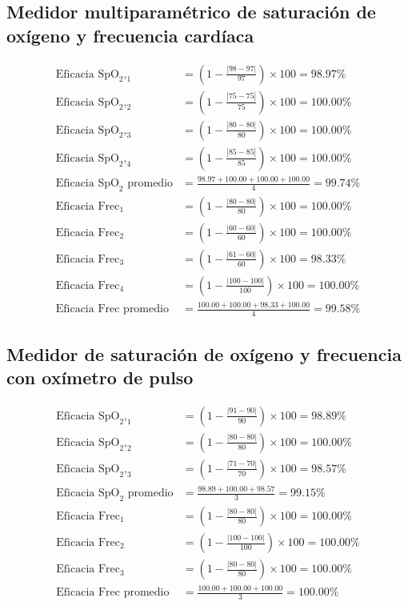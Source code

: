 \subsection{Medidor multiparamétrico de saturación de oxígeno y frecuencia cardíaca}
\begin{align*}
\text{Eficacia SpO}_2\text{,}_1 &= \left(1 - \frac{|98-97|}{97}\right) \times 100 = 98.97\% \\
\text{Eficacia SpO}_2\text{,}_2 &= \left(1 - \frac{|75-75|}{75}\right) \times 100 = 100.00\% \\
\text{Eficacia SpO}_2\text{,}_3 &= \left(1 - \frac{|80-80|}{80}\right) \times 100 = 100.00\% \\
\text{Eficacia SpO}_2\text{,}_4 &= \left(1 - \frac{|85-85|}{85}\right) \times 100 = 100.00\% \\
\text{Eficacia SpO}_2\text{ promedio} &= \frac{98.97 + 100.00 + 100.00 + 100.00}{4} = 99.74\% \\[10pt]
\text{Eficacia Frec}_1 &= \left(1 - \frac{|80-80|}{80}\right) \times 100 = 100.00\% \\
\text{Eficacia Frec}_2 &= \left(1 - \frac{|60-60|}{60}\right) \times 100 = 100.00\% \\
\text{Eficacia Frec}_3 &= \left(1 - \frac{|61-60|}{60}\right) \times 100 = 98.33\% \\
\text{Eficacia Frec}_4 &= \left(1 - \frac{|100-100|}{100}\right) \times 100 = 100.00\% \\
\text{Eficacia Frec promedio} &= \frac{100.00 + 100.00 + 98.33 + 100.00}{4} = 99.58\%
\end{align*}

\subsection{Medidor de saturación de oxígeno y frecuencia con oxímetro de pulso}
\begin{align*}
\text{Eficacia SpO}_2\text{,}_1 &= \left(1 - \frac{|91-90|}{90}\right) \times 100 = 98.89\% \\
\text{Eficacia SpO}_2\text{,}_2 &= \left(1 - \frac{|80-80|}{80}\right) \times 100 = 100.00\% \\
\text{Eficacia SpO}_2\text{,}_3 &= \left(1 - \frac{|71-70|}{70}\right) \times 100 = 98.57\% \\
\text{Eficacia SpO}_2\text{ promedio} &= \frac{98.89 + 100.00 + 98.57}{3} = 99.15\% \\[10pt]
\text{Eficacia Frec}_1 &= \left(1 - \frac{|80-80|}{80}\right) \times 100 = 100.00\% \\
\text{Eficacia Frec}_2 &= \left(1 - \frac{|100-100|}{100}\right) \times 100 = 100.00\% \\
\text{Eficacia Frec}_3 &= \left(1 - \frac{|80-80|}{80}\right) \times 100 = 100.00\% \\
\text{Eficacia Frec promedio} &= \frac{100.00 + 100.00 + 100.00}{3} = 100.00\%
\end{align*}